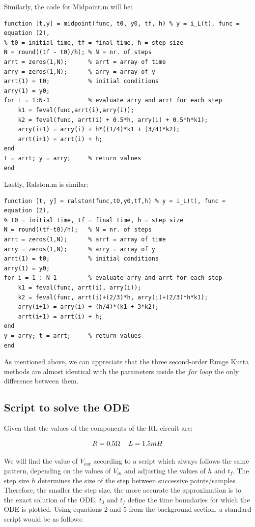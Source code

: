 \documentclass[11pt,a4paper]{article}
\begin{document}
\vspace{-2mm}Similarly, the code for Midpoint.m will be:
\vspace{-1mm}
\begin{verbatim}
function [t,y] = midpoint(func, t0, y0, tf, h) % y = i_L(t), func = equation (2),
% t0 = initial time, tf = final time, h = step size
N = round((tf - t0)/h); % N = nr. of steps
arrt = zeros(1,N);      % arrt = array of time
arry = zeros(1,N);      % arry = array of y
arrt(1) = t0;           % initial conditions
arry(1) = y0;
for i = 1:N-1           % evaluate arry and arrt for each step
    k1 = feval(func,arrt(i),arry(i));
    k2 = feval(func, arrt(i) + 0.5*h, arry(i) + 0.5*h*k1);
    arry(i+1) = arry(i) + h*((1/4)*k1 + (3/4)*k2);
    arrt(i+1) = arrt(i) + h;
end
t = arrt; y = arry;     % return values
end
\end{verbatim}

Lastly, Ralston.m is similar:

\begin{verbatim}
function [t, y] = ralston(func,t0,y0,tf,h) % y = i_L(t), func = equation (2),
% t0 = initial time, tf = final time, h = step size
N = round((tf-t0)/h);   % N = nr. of steps
arrt = zeros(1,N);      % arrt = array of time
arry = zeros(1,N);      % arry = array of y
arrt(1) = t0;           % initial conditions
arry(1) = y0;
for i = 1 : N-1         % evaluate arry and arrt for each step
    k1 = feval(func, arrt(i), arry(i));
    k2 = feval(func, arrt(i)+(2/3)*h, arry(i)+(2/3)*h*k1);
    arry(i+1) = arry(i) + (h/4)*(k1 + 3*k2);
    arrt(i+1) = arrt(i) + h;
end
y = arry; t = arrt;     % return values
end
\end{verbatim}

As mentioned above, we can appreciate that the three second-order Runge Kutta methods are almost identical with the parameters inside the $for$ $loop$ the only difference between them.

\newpage
\subsection{Script to solve the ODE}
Given that the values of the components of the RL circuit are:

\[R = 0.5\Omega\ \hspace{3mm} L = 1.5mH\]

We will find the value of $V_{out}$ according to a script which always follows the same pattern, depending on the values of $V_{in}$ and adjusting the values of $h$ and $t_f$. The step size $h$ determines the size of the step between successive points/samples. Therefore, the smaller the step size, the more accurate the approximation is to the exact solution of the ODE. $t_0$ and $t_f$ define the time boundaries for which the ODE is plotted.
Using equations 2 and 5 from the background section, a standard script would be as follows:
\end{document}
